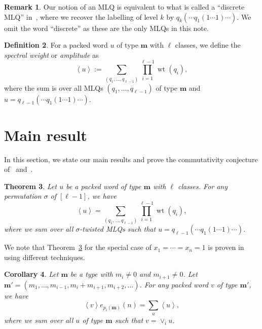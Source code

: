 \documentclass[reqno]{amsart}
\newcommand{\0}{\phantom{c}}
\newcommand{\swt}[1]{\left\langle #1 \right\rangle} %
\newcommand{\merge}[1]{\vee_{#1}} %
\DeclareMathOperator{\wt}{wt} %
\newcommand{\mm}{\mathbf{m}}
\let\sumnonlimits\sum
\let\prodnonlimits\prod
\renewcommand{\sum}{\sumnonlimits\limits}
\renewcommand{\prod}{\prodnonlimits\limits}
\newcommand{\ive}[1]{\left[ #1 \right]}
\newcommand{\defn}[1]{{\color{darkred}\emph{#1}}} %
\theoremstyle{plain}
\newtheorem{thm}{Theorem}[section]
\newtheorem{cor}[thm]{Corollary}
\theoremstyle{definition}
\newtheorem{dfn}[thm]{Definition}
\newtheorem{remark}[thm]{Remark}
\numberwithin{equation}{section}
\begin{document}
\begin{remark}
Our notion of an MLQ is equivalent to what is called a ``discrete MLQ'' in~\cite[\S 2.2]{AasLin17}, where we recover the labelling of level $k$ by $q_k( \cdots q_1(1 \dotsm 1) \cdots )$.
We omit the word ``discrete'' as these are the only MLQs in this note.
\end{remark}

\begin{dfn}
For a packed word $u$ of type $\mm$ with $\ell$ classes, we define the \defn{spectral weight} or \defn{amplitude} as
\begin{equation}
\label{eq:amplitude}
  \swt{u} := \sum_{(q_1, \dotsc, q_{\ell-1})} \prod_{i=1}^{\ell-1} \wt(q_i),
\end{equation}
where the sum is over all MLQs $(q_1, \dotsc, q_{\ell-1})$ of type $\mm$ and $u = q_{\ell-1}( \cdots q_1(1 \dotsm 1) \cdots )$.
\end{dfn}





\section{Main result}
\label{sec:result}


In this section, we state our main results and prove the commutativity conjecture of~\cite{AAMP} and~\cite[Conj.~3.10]{AasLin17}.

\begin{thm}
\label{thm:permutation}
  Let $u$ be a packed word of type $\mm$ with $\ell$ classes.
  For any permutation $\sigma$ of $\ive{\ell-1}$, we have 
  \[
  \swt{u} = \sum_{(q_1, \dots, q_{\ell-1})} \prod_{i=1}^{\ell-1} \wt(q_i),
  \]
  where we sum over all $\sigma$-twisted MLQs such that $u = q_{\ell-1}(\cdots q_1(1\dotsm 1) \cdots )$.
\end{thm}

We note that Theorem~\ref{thm:permutation} for the special case of $x_1 = \cdots = x_n = 1$ is proven in~\cite{AAMP} using different techniques.

\begin{cor}
\label{co:merge}
  Let $\mm$ be a type with $m_i \neq 0$ and $m_{i+1} \neq 0$.
  Let $\mm' = (m_1, \dotsc, m_{i-1}, m_i + m_{i+1}, m_{i+2}, \ldots)$.
  For any packed word $v$ of type $\mm'$, we have
\[
  \swt{v} e_{p_i(\mm)}(n) = \sum_u \swt{u},
\]
where we sum over all $u$ of type $\mm$ such that $v = \merge{i} u$.
\end{cor}
\end{document}
